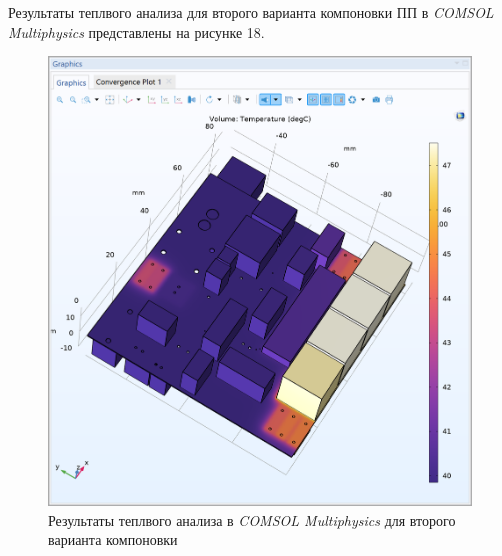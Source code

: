 Результаты теплвого анализа для второго варианта компоновки ПП в
\textit{COMSOL Multiphysics} представлены на рисунке 18.

\begin{figure}[h]
  \centering
  \includegraphics[scale=0.5]{../img/scrot/Screenshot-2024-05-16-023133.png}
  \caption{Результаты теплвого анализа в \textit{COMSOL Multiphysics}
  для второго варианта компоновки}

\end{figure}

